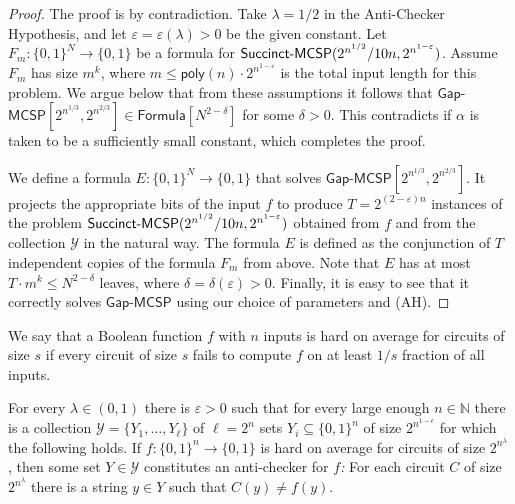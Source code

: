 \documentclass{toc}
\newcommand{\MCSP}{\ensuremath{{\sf MCSP}}\xspace}
\newcommand{\Succinct}{\ensuremath{{\sf Succinct}\text{-}\ensuremath{\MCSP}}\xspace}
\newcommand{\AH}{\ensuremath{{\sf AH}}\xspace}
\newcommand{\gapmcsp}{\mathsf{Gap}$-$\mathsf{MCSP}}
\begin{document}
\begin{proof}
  The proof is by contradiction. Take $\lambda = 1/2$ in the Anti-Checker Hypothesis, and let $\varepsilon = \varepsilon(\lambda)>0$ be the given constant. Let $F_m \colon \{0,1\}^N \to \{0,1\}$ be a formula
%
%
for $\Succinct(2^{n^{1/2}}/10n, 2^{n^{1 - \varepsilon}})$.
%
Assume $F_m$ has size $m^k$,  %
where $m \leq \mathsf{poly}(n) \cdot 2^{n^{1 - \varepsilon}}$ is the total input length for this problem. We argue below that from these assumptions it follows that $\gapmcsp[2^{n^{1/3}}, 2^{n^{2/3}}] \in \mathsf{Formula}[N^{2 - \delta}]$ for some $\delta > 0$. This contradicts  if $\alpha$ is taken to be a sufficiently small constant, which completes the proof.

We define a formula $E \colon \{0,1\}^N \to \{0,1\}$ that solves $\gapmcsp[2^{n^{1/3}}, 2^{n^{2/3}}]$. It projects the appropriate bits of the input $f$ to produce $T = 2^{(2 - \varepsilon)n}$ instances of the problem $\Succinct(2^{n^{1/2}}/10n, 2^{n^{1 - \varepsilon}})$ obtained from $f$ and from the collection $\mathcal{Y}$ in the natural way. The formula $E$ is defined as the conjunction of $T$ independent copies of the formula $F_m$ from above. Note that $E$ has at most $T \cdot m^k \leq N^{2 - \delta}$ leaves, where $\delta  = \delta (\varepsilon) > 0$. Finally, it is easy to see that it correctly solves $\gapmcsp$ using our choice of parameters and (AH).
\end{proof}



We say that a Boolean function $f$ with $n$ inputs is hard on average for circuits of size $s$ if every circuit of size $s$ fails to compute $f$ on at least $1/s$ fraction of all inputs.

\begin{proposition}[Average-Case \AH]\label{p:AH_average} For every $\lambda\in (0,1)$ there is $\varepsilon > 0$ such that for every large enough $n \in \mathbb{N}$ there is a collection $\mathcal{Y} = \{Y_1, \ldots, Y_\ell\}$ of $\ell = 2^n$ sets $Y_i \subseteq \{0,1\}^n$ of size $2^{n^{1-\epsilon}}$ for which the following holds. If $f \colon \{0,1\}^n \to \{0,1\}$ is hard on average for circuits of size $2^{n^\lambda}$, then some set $Y \in \mathcal{Y}$ constitutes an anti-checker for $f$\emph{:} For each circuit $C$ of size $2^{n^{\lambda}}$ there is a string  $y \in Y$ such that $C(y)\ne f(y)$.
\end{proposition}
\end{document}
